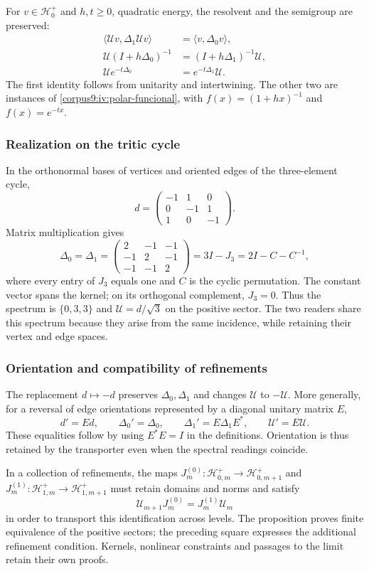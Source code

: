 For \(v\in\mathcal H_0^+\) and \(h,t\geq0\), quadratic energy,
the resolvent and the semigroup are preserved:
\begin{align}
 \langle\mathcal Uv,\Delta_1\mathcal Uv\rangle
    &=\langle v,\Delta_0v\rangle,\\
 \mathcal U(I+h\Delta_0)^{-1}
    &=(I+h\Delta_1)^{-1}\mathcal U,\\
 \mathcal Ue^{-t\Delta_0}
    &=e^{-t\Delta_1}\mathcal U.
 \label{corpus9:iv:polar-lectores}
\end{align}
The first identity follows from unitarity and
intertwining. The other two are instances of
\eqref{corpus9:iv:polar-funcional}, with
\(f(x)=(1+hx)^{-1}\) and \(f(x)=e^{-tx}\).

\subsubsection{Realization on the tritic cycle}
In the orthonormal bases of vertices and oriented edges
of the three-element cycle,
\[
 d=
 \begin{pmatrix}
 -1&1&0\\
 0&-1&1\\
 1&0&-1
 \end{pmatrix}.
\]
Matrix multiplication gives
\[
 \Delta_0=\Delta_1=
 \begin{pmatrix}
 2&-1&-1\\
 -1&2&-1\\
 -1&-1&2
 \end{pmatrix}
 =3I-J_3=2I-C-C^{-1},
\]
where every entry of \(J_3\) equals one and \(C\)
is the cyclic permutation. The constant vector spans the
kernel; on its orthogonal complement, \(J_3=0\).
Thus the spectrum is \(\{0,3,3\}\) and
\(\mathcal U=d/\sqrt3\) on the positive sector.
The two readers share this spectrum because they arise from
the same incidence, while retaining their vertex and
edge spaces.

\subsubsection{Orientation and compatibility of refinements}
The replacement \(d\mapsto-d\) preserves \(\Delta_0,\Delta_1\)
and changes \(\mathcal U\) to \(-\mathcal U\). More
generally, for a reversal of edge orientations represented
by a diagonal unitary matrix \(E\),
\[
 d'=Ed,\qquad \Delta_0'=\Delta_0,\qquad
 \Delta_1'=E\Delta_1E^*,\qquad \mathcal U'=E\mathcal U.
\]
These equalities follow by using \(E^*E=I\) in the
definitions. Orientation is thus retained by the
transporter even when the spectral readings
coincide.

In a collection of refinements, the maps
\(J_m^{(0)}:\mathcal H_{0,m}^+\to\mathcal H_{0,m+1}^+\)
and
\(J_m^{(1)}:\mathcal H_{1,m}^+\to\mathcal H_{1,m+1}^+\)
must retain domains and norms and satisfy
\[
 \mathcal U_{m+1}J_m^{(0)}
    =J_m^{(1)}\mathcal U_m
\]
in order to transport this identification across levels.
The proposition proves finite equivalence of the positive
sectors; the preceding square expresses the additional
refinement condition. Kernels, nonlinear constraints
and passages to the limit retain their own proofs.
